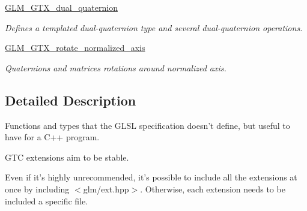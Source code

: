 \begin{CompactItemize}
\item 
\hyperlink{group__gtc__dual__quaternion}{GLM\_\-GTX\_\-dual\_\-quaternion}
\begin{CompactList}\small\item\em Defines a templated dual-quaternion type and several dual-quaternion operations. \item\end{CompactList}

\item 
\hyperlink{group__gtx__rotate__normalized__axis}{GLM\_\-GTX\_\-rotate\_\-normalized\_\-axis}
\begin{CompactList}\small\item\em Quaternions and matrices rotations around normalized axis. \item\end{CompactList}

\end{CompactItemize}


\subsection{Detailed Description}
Functions and types that the GLSL specification doesn't define, but useful to have for a C++ program. 

GTC extensions aim to be stable.

Even if it's highly unrecommended, it's possible to include all the extensions at once by including $<$glm/ext.hpp$>$. Otherwise, each extension needs to be included a specific file. 